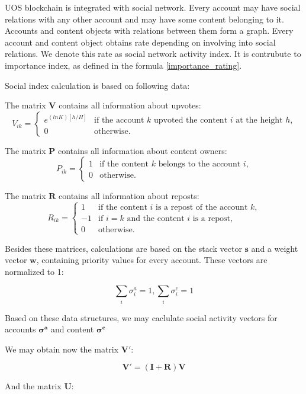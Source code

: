 \documentclass[a4paper,12pt]{article}
\begin{document}
U{\degree}OS blockchain is integrated with social network. Every account may have social relations with any other account and may have some content belonging to it. Accounts and content objects with relations between them form a graph. Every account and content object obtains rate depending on involving into social relations. We denote this rate as social network activity index. It is contrubute to importance index, as defined in the formula \ref{importance_rating}.

Social index calculation is based on following data:

The matrix $\boldsymbol{V}$ contains all information about upvotes:
$$
V_{ik} = \begin{cases}
 e^{(ln K)[h/H]}
 & \text{if the account $k$ upvoted the content $i$ at the height $h$,}\\
 0 & \text{otherwise.}
\end{cases}
$$

The matrix $\boldsymbol{P}$ contains all information about content owners:
$$
P_{ik} = \begin{cases}
 1
 & \text{if the content $k$ belongs to the account $i$,}\\
 0 & \text{otherwise.}
\end{cases}
$$

The matrix $\boldsymbol{R}$ contains all information about reposts:
$$
R_{ik} = \begin{cases}
 1 & \text{if the content $i$ is a repost of the account $k$,}\\
 -1 & \text{if $i=k$ and the content $i$ is a repost,}\\
 0 & \text{otherwise.}
\end{cases}
$$

Besides these matrices, calculations are based on the stack vector $\boldsymbol{s}$ and a weight vector $\boldsymbol{w}$, containing priority values for every account. These vectors are normalized to 1:

$$
\sum_i{\sigma^a_i} = 1, \sum_i{\sigma^c_i} = 1
$$


Based on these data structures, we may caclulate social activity vectors for accounts $\boldsymbol{\sigma^a}$ and content $\boldsymbol{\sigma^c}$

We may obtain now the matrix $\boldsymbol{V'}$:

$$
\boldsymbol{V'} = ( \boldsymbol{I} + \boldsymbol{R} ) \boldsymbol{V}
$$

And the matrix $\boldsymbol{U}:$
\end{document}
